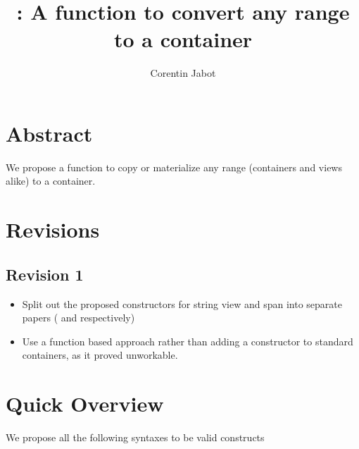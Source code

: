 \documentclass{wg21}
\title{\tcode{ranges::to}: A function to convert any range to a container}
\author{Corentin Jabot}{corentin.jabot@gmail.com}
\begin{document}
\maketitle

\section{Abstract}

We propose a function to copy or materialize any range (containers and views alike) to a container.

\section{Revisions}

\subsection*{Revision 1}
\begin{itemize}
	\item Split out the proposed constructors for string view and span into separate papers (\cite{P1391} and \cite{P1394} respectively)
	\item Use a function based approach rather than adding a constructor to standard containers, as it proved unworkable.
\end{itemize}
\newpage
\section{Quick Overview}
We propose all the following syntaxes to be valid constructs
\end{document}
